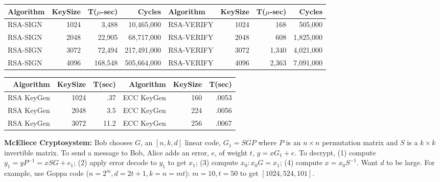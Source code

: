 \begin{center}
\begin{tabular} {|l|rrr|l|rrr|}
\hline
{\bf Algorithm} & {\bf KeySize} & {\bf T($\mu$-sec)} & {\bf Cycles} &
{\bf Algorithm} & {\bf KeySize} & {\bf T($\mu$-sec)} & {\bf Cycles} \\
\hline
RSA-SIGN & 1024 & 3,488 & 10,465,000 &
RSA-VERIFY	& 1024 & 168 & 505,000 \\
RSA-SIGN & 2048 & 22,905 & 68,717,000 &
RSA-VERIFY	& 2048 & 608 & 1,825,000 \\
RSA-SIGN & 3072 & 72,494 & 217,491,000 &
RSA-VERIFY & 3072 & 1,340 & 4,021,000 \\
RSA-SIGN & 4096 & 168,548 & 505,664,000 &
RSA-VERIFY & 4096 & 2,363 & 7,091,000 \\
\hline
\end{tabular}
\end{center}
\begin{center}
\begin{tabular} {|rrr||rrr|}
\hline
{\bf Algorithm} & {\bf KeySize} & {\bf T(sec)} & {\bf Algorithm} & {\bf KeySize} & {\bf T(sec)} \\
\hline
RSA KeyGen & 1024 & .37 & ECC KeyGen & 160 & .0053 \\
RSA KeyGen & 2048 & 3.5 & ECC KeyGen & 224 & .0056 \\
RSA KeyGen & 3072 & 11.2 & ECC KeyGen & 256 & .0067 \\
\hline
\end{tabular}
\end{center}
{\bf McEliece Cryptosystem: }  Bob chooses $G$, an $[n,k,d]$ linear code,
$G_1= SGP$ where $P$ is an $n \times n$ permutation matrix and $S$ is a $k \times k$
invertible matrix.  To send a message to Bob, Alice adds an error, $e$, of weight $t$,
$y=xG_1+e$.  To decrypt, (1) compute $y_1= yP^{-1}= xSG+e_1$; (2) apply error
decode to $y_1$ to get $x_1$; (3) compute $x_0: x_0G= x_1$; (4) compute $x=x_0S^{-1}$.
Want $d$ to be large.  For example, use Goppa code ($n=2^m, d= 2t+1, k= n=mt$): 
$m=10, t=50$ to get $[1024, 524, 101]$.
\\
\\

